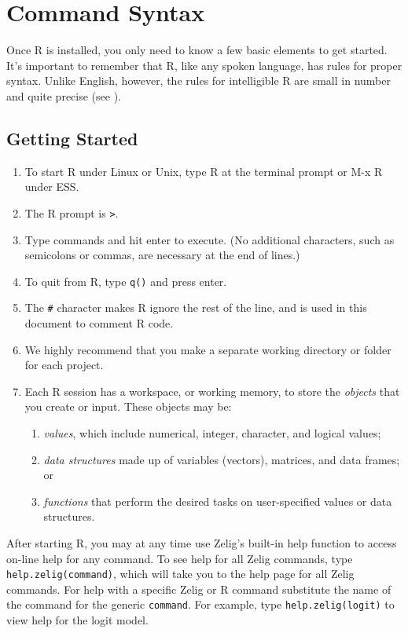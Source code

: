 \section{Command Syntax}

Once R is installed, you only need to know a few basic elements to get
started.  It's important to remember that R, like any spoken
language, has rules for proper syntax.  Unlike English, however, the
rules for intelligible R are small in number and quite precise (see
).

\subsection{Getting Started}

\begin{enumerate}
\item To start R under Linux or Unix, type R at the terminal prompt or
  M-x R under ESS.
\item The R prompt is {\tt >}.
\item Type commands and hit enter to execute.  (No additional
  characters, such as semicolons or commas, are necessary at the end
  of lines.)
\item To quit from R, type \texttt{q()} and press enter.
\item The {\tt \#} character makes R ignore the rest of the line, and
  is used in this document to comment R code.
\item We highly recommend that you make a separate working directory
  or folder for each project.
\item Each R session has a workspace, or working memory, to store the
  \emph{objects} that you create or input.  These objects may be:
\begin{enumerate} 
\item \emph{values}, which include numerical, integer, character, and
  logical values;
\item \emph{data structures} made up of variables (vectors), matrices,
  and data frames; or
\item \emph{functions} that perform the desired tasks on
  user-specified values or data structures.
\end{enumerate}
\end{enumerate}

After starting R, you may at any time use Zelig's built-in help
function to access on-line help for any command.  To see help for all
Zelig commands, type {\tt help.zelig(command)}, which will take you
to the help page for all Zelig commands.  For help with a specific
Zelig or R command substitute the name of the command for the generic
{\tt command}.  For example, type {\tt help.zelig(logit)} to view
help for the logit model.

